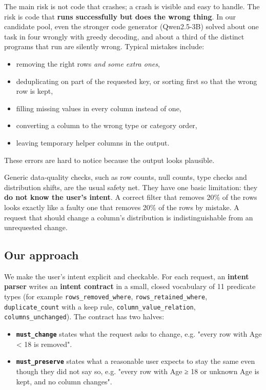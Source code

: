 \documentclass[11pt]{article}
\providecommand{\tightlist}{\setlength{\itemsep}{0pt}\setlength{\parskip}{0pt}}
\begin{document}
The main risk is not code that crashes; a crash is visible and easy to
handle. The risk is code that \textbf{runs successfully but does the
wrong thing}. In our candidate pool, even the stronger code generator
(Qwen2.5-3B) solved about one task in four wrongly with greedy decoding,
and about a third of the distinct programs that run are silently wrong.
Typical mistakes include:

\begin{itemize}
\tightlist
\item
  removing the right rows \emph{and some extra ones},
\item
  deduplicating on part of the requested key, or sorting first so that
  the wrong row is kept,
\item
  filling missing values in every column instead of one,
\item
  converting a column to the wrong type or category order,
\item
  leaving temporary helper columns in the output.
\end{itemize}

These errors are hard to notice because the output looks plausible.

Generic data-quality checks, such as row counts, null counts, type
checks and distribution shifts, are the usual safety net. They have one
basic limitation: they \textbf{do not know the user's intent}. A correct
filter that removes 20\% of the rows looks exactly like a faulty one
that removes 20\% of the rows by mistake. A request that should change a
column's distribution is indistinguishable from an unrequested change.

\subsection{Our approach}

We make the user's intent explicit and checkable. For each request, an
\textbf{intent parser} writes an \textbf{intent contract} in a small,
closed vocabulary of 11 predicate types (for example
\texttt{rows\_\allowbreak{}removed\_\allowbreak{}where},
\texttt{rows\_\allowbreak{}retained\_\allowbreak{}where},
\texttt{duplicate\_\allowbreak{}count} with a keep rule,
\texttt{column\_\allowbreak{}value\_\allowbreak{}relation},
\texttt{columns\_\allowbreak{}unchanged}). The contract has two halves:

\begin{itemize}
\tightlist
\item
  \textbf{\texttt{must\_\allowbreak{}change}} states what the request
  asks to change, e.g. "every row with Age \textless{} 18 is removed".
\item
  \textbf{\texttt{must\_\allowbreak{}preserve}} states what a reasonable
  user expects to stay the same even though they did not say so, e.g.
  "every row with Age ≥ 18 or unknown Age is kept, and no column
  changes".
\end{itemize}
\end{document}
